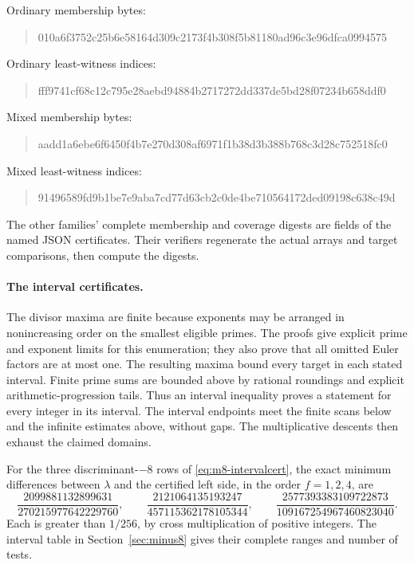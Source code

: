 \noindent Ordinary membership bytes:
\begin{quote}\footnotesize\ttfamily
010a6f3752c25b6e58164d309c2173f4b308f5b81180ad96c3e96dfca0994575
\end{quote}
\noindent Ordinary least-witness indices:
\begin{quote}\footnotesize\ttfamily
fff9741cf68c12c795e28aebd94884b2717272dd337de5bd28f07234b658ddf0
\end{quote}
\noindent Mixed membership bytes:
\begin{quote}\footnotesize\ttfamily
aadd1a6ebe6f6450f4b7e270d308af6971f1b38d3b388b768c3d28c752518fc0
\end{quote}
\begin{samepage}
\noindent Mixed least-witness indices:
\begin{quote}\footnotesize\ttfamily
91496589fd9b1be7e9aba7cd77d63cb2c0de4be710564172ded09198c638c49d
\end{quote}
\end{samepage}
The other families' complete membership and coverage digests are fields
of the named JSON certificates.  Their verifiers regenerate the actual
arrays and target comparisons, then compute the digests.

\paragraph{The interval certificates.}
The divisor maxima are finite because exponents may be arranged in
nonincreasing order on the smallest eligible primes.  The proofs give
explicit prime and exponent limits for this enumeration; they also
prove that all omitted Euler factors are at most one.
The resulting maxima bound every target in each stated interval.
Finite prime sums are bounded above by rational roundings and explicit
arithmetic-progression tails.  Thus an interval inequality proves a
statement for every integer in its interval.  The interval endpoints
meet the finite scans below and the infinite estimates above, without
gaps.  The multiplicative descents then exhaust the claimed domains.

For the three discriminant-$-8$ rows of
\eqref{eq:m8-intervalcert}, the exact minimum differences between
$\lambda$ and the certified left side, in the order $f=1,2,4$, are
\[
 \frac{2099881132899631}{270215977642229760},\qquad
 \frac{2121064135193247}{457115362178105344},\qquad
 \frac{2577393383109722873}{109167254967460823040}.
\]
Each is greater than $1/256$, by cross multiplication of positive
integers. The interval table in Section~\ref{sec:minus8} gives their
complete ranges and number of tests.

